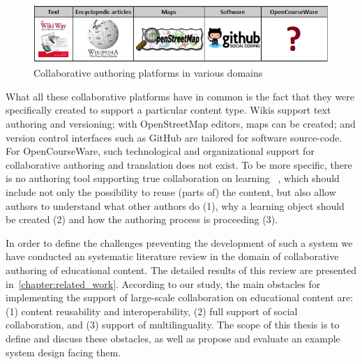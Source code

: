 \documentclass[ngerman,UKenglish,table]{scrbook}
\begin{document}
\begin{figure}
\centering
\includegraphics[scale=1]{images/empty_spot.png}
\caption{Collaborative authoring platforms in various domains}
\label{fig:slidewiki_place}
\end{figure}

What all these collaborative platforms have in common is the fact that they were specifically created to support a particular content type.
Wikis support text authoring and versioning; with OpenStreetMap editors, maps can be created; and version control interfaces such as GitHub are tailored for software source-code.
For OpenCourseWare, such technological and organizational support for collaborative authoring and translation does not exist.
To be more specific, there is no authoring tool supporting true collaboration on learning ~\cite{Nurjanah2011}, which should include not only the possibility to reuse (parts of) the content, but also allow authors to understand what other authors do (1), why a learning object should be created (2) and how the authoring process is proceeding (3). 

In order to define the challenges preventing the development of such a system we have conducted an systematic literature review in the domain of collaborative authoring of educational content.
The detailed results of this review are presented in~\autoref{chapter:related_work}.
According to our study, the main obstacles for implementing the support of large-scale collaboration on educational content are: (1) content reusability and interoperability, (2) full support of social collaboration, and (3) support of multilinguality.
The scope of this thesis is to define and discuss these obstacles, as well as propose and evaluate an example system design facing them.
\end{document}
